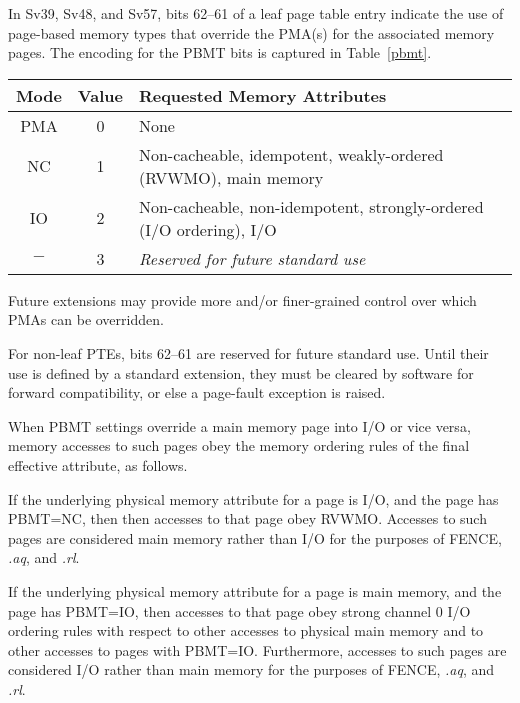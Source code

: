 In Sv39, Sv48, and Sv57, bits 62--61 of a leaf page table entry indicate the use
of page-based memory types that override the PMA(s) for the associated memory
pages.  The encoding for the PBMT bits is captured in Table~\ref{pbmt}.

\begin{table*}[h!]
\begin{center}
\begin{tabular}{|c|c|l|}
\hline
Mode & Value  & Requested Memory Attributes \\
\hline
PMA  & 0      & None \\
NC   & 1      & Non-cacheable, idempotent, weakly-ordered (RVWMO), main memory \\
IO   & 2      & Non-cacheable, non-idempotent, strongly-ordered (I/O ordering), I/O \\
$-$  & 3      & {\em Reserved for future standard use} \\
\hline
\end{tabular}
\end{center}
\caption{Encodings for the PBMT field in Sv39, Sv48, and Sv57 PTEs.  Attributes
not mentioned are inherited from the PMA associated with the physical address.}
\label{pbmt}
\end{table*}

\begin{commentary}
Future extensions may provide more and/or finer-grained control over which PMAs
can be overridden.
\end{commentary}

For non-leaf PTEs, bits 62--61 are reserved for future standard use.  Until
their use is defined by a standard extension, they must be cleared by software
for forward compatibility, or else a page-fault exception is raised.

When PBMT settings override a main memory page into I/O or vice versa, memory
accesses to such pages obey the memory ordering rules of the final effective
attribute, as follows.

If the underlying physical memory attribute for a page is I/O, and the page has
PBMT=NC, then then accesses to that page obey RVWMO.  Accesses to such pages are
considered main memory rather than I/O for the purposes of FENCE, {\em.aq}, and
{\em.rl}.

If the underlying physical memory attribute for a page is main memory, and the
page has PBMT=IO, then accesses to that page obey strong channel 0 I/O ordering
rules with respect to other accesses to physical main memory and to other
accesses to pages with PBMT=IO.  Furthermore, accesses to such pages are
considered I/O rather than main memory for the purposes of FENCE, {\em.aq}, and
{\em.rl}.

